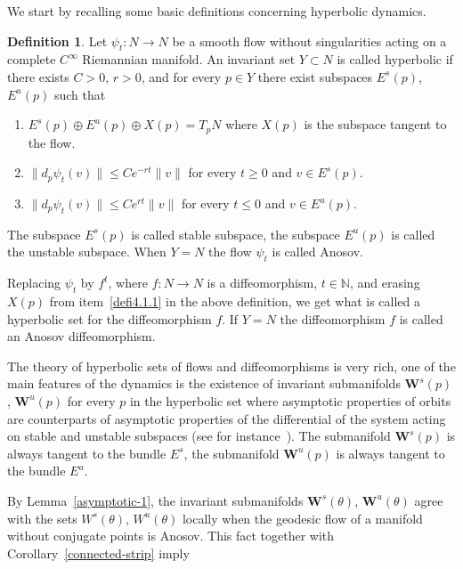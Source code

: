\documentclass[10pt]{amsart}
\theoremstyle{definition}
\newtheorem{defi}[cdrthm]{Definition}
\newcommand{\bfW}{\mathbf{W}}
\newcommand{\bbN}{\mathbb{N}}
\begin{document}
We start by recalling some basic definitions concerning hyperbolic dynamics.

\begin{defi}\label{hyperbolic1}
Let $\psi_{t}: N\longrightarrow N$ be a smooth flow without singularities acting on a complete $C^{\infty}$ Riemannian manifold. An invariant set $Y \subset N$ is called hyperbolic if there exists $C>0$, $r>0$, and for every $ p \in Y$ there exist subspaces $E^{s}(p)$, $E^{u}(p)$ such that
\begin{enumerate}
\item \label{defi4.1.1}$E^{s}(p) \oplus E^{u}(p) \oplus X(p) = T_{p}N$ where $X(p)$ is the subspace tangent to the flow.
\item \label{defi4.1.2}$\parallel d_{p}\psi_{t}(v) \parallel \leq Ce^{-rt} \parallel v \parallel $ for every $t \geq 0$ and $v \in E^{s}(p)$.
\item \label{defi4.1.3}$\parallel d_{p}\psi_{t}(v) \parallel \leq Ce^{rt} \parallel v \parallel $ for every $t \leq 0$ and $v \in E^{u}(p)$.
\end{enumerate}

The subspace $E^{s}(p)$ is called stable subspace, the subspace $E^{u}(p)$ is called the unstable subspace. When $Y = N$ the flow $\psi_{t}$ is called Anosov.

Replacing $\psi_{t}$ by $f^{t}$, where $f:N \longrightarrow N$ is a diffeomorphism, $t \in \bbN$, and erasing $X(p)$ from item~\eqref{defi4.1.1} in the above definition, we get what is called a hyperbolic set for the diffeomorphism $f$. If $Y=N$ the diffeomorphism $f$ is called an Anosov diffeomorphism.
\end{defi}

The theory of hyperbolic sets of flows and diffeomorphisms is very rich, one of the main features of the dynamics is the existence of invariant submanifolds $\bfW^{s}(p)$, $\bfW^{u}(p)$ for every $p$ in the hyperbolic set where asymptotic properties of orbits are counterparts of asymptotic properties of the differential of the system acting on stable and unstable subspaces (see for instance~\cite{kn:Anosov,kn:HPS}). The submanifold $\bfW^{s}(p)$ is always tangent to the bundle $E^{s}$, the submanifold $\bfW^{u}(p)$ is always tangent to the bundle $E^{u}$.

By Lemma~\ref{asymptotic-1}, the invariant submanifolds $\bfW^{s}(\theta)$, $\bfW^{u}(\theta)$ agree with the sets $W^{s}(\theta)$, $W^{u}(\theta)$ locally when the geodesic flow of a manifold without conjugate points is Anosov. This fact together with Corollary~\ref{connected-strip} imply
\end{document}
